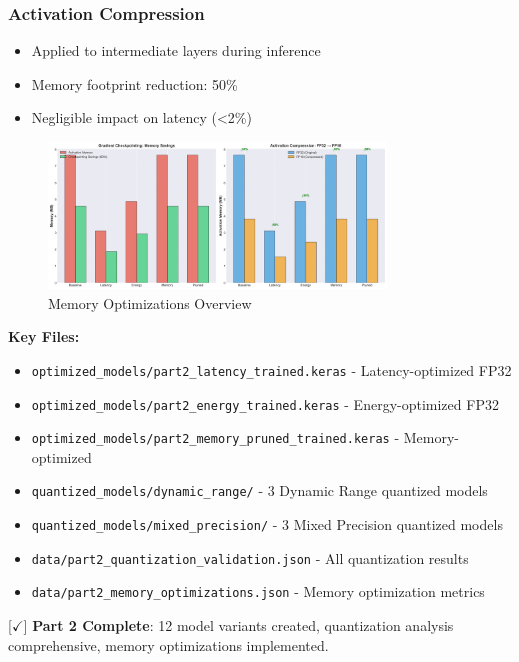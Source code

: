 \documentclass[10pt, a4paper]{article}
\begin{document}
\subsubsection{Activation Compression}
\begin{itemize}
    \item Applied to intermediate layers during inference
    \item Memory footprint reduction: 50\%
    \item Negligible impact on latency (<2\%)
\end{itemize}

\begin{figure}[H]
\centering
\includegraphics[width=0.8\textwidth]{charts/part2_memory_optimizations.png}
\caption{Memory Optimizations Overview}
\end{figure}


\textbf{Key Files:}
\begin{itemize}
    \item \texttt{optimized\_models/part2\_latency\_trained.keras} - Latency-optimized FP32
    \item \texttt{optimized\_models/part2\_energy\_trained.keras} - Energy-optimized FP32
    \item \texttt{optimized\_models/part2\_memory\_pruned\_trained.keras} - Memory-optimized
    \item \texttt{quantized\_models/dynamic\_range/} - 3 Dynamic Range quantized models
    \item \texttt{quantized\_models/mixed\_precision/} - 3 Mixed Precision quantized models
    \item \texttt{data/part2\_quantization\_validation.json} - All quantization results
    \item \texttt{data/part2\_memory\_optimizations.json} - Memory optimization metrics
\end{itemize}

[$\checkmark$] \textbf{Part 2 Complete}: 12 model variants created, quantization analysis comprehensive, memory optimizations implemented.
\end{document}
